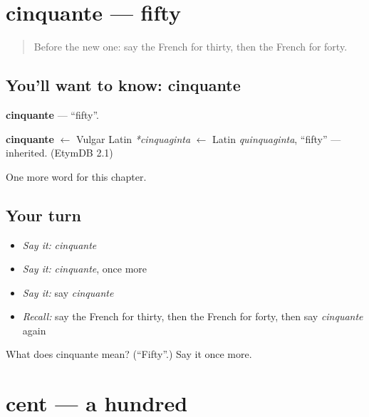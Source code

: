 \section[cinquante]{cinquante — fifty}

\label{lesson:FR-C105-cinquante}



\begin{quote}
Before the new one: say the French for thirty, then the French for forty.
\end{quote}

\subsection*{You'll want to know: cinquante}
\textbf{cinquante} — \textquotedblleft{}fifty\textquotedblright{}.

\begin{cousinweb}
\textbf{cinquante} $\leftarrow$ Vulgar Latin \emph{*cinquaginta} $\leftarrow$ Latin \emph{quinquaginta}, \textquotedblleft{}fifty\textquotedblright{} — inherited. (EtymDB 2.1)
\end{cousinweb}

\begin{grammarlens}[title={What you've built}]
One more word for this chapter.
\end{grammarlens}

\subsection*{Your turn}
\begin{itemize}
\raggedright
  \item \emph{Say it:} \emph{cinquante}
  \item \emph{Say it:} \emph{cinquante}, once more
  \item \emph{Say it:} say \emph{cinquante}
  \item \emph{Recall:} say the French for thirty, then the French for forty, then say \emph{cinquante} again
\end{itemize}

\begin{tcolorbox}[breakable,colback=teal!4,colframe=teal!35!black,title={Before you move on}]
What does cinquante mean? (\textquotedblleft{}Fifty\textquotedblright{}.) Say it once more.
\end{tcolorbox}
\section[cent]{cent — a hundred}

